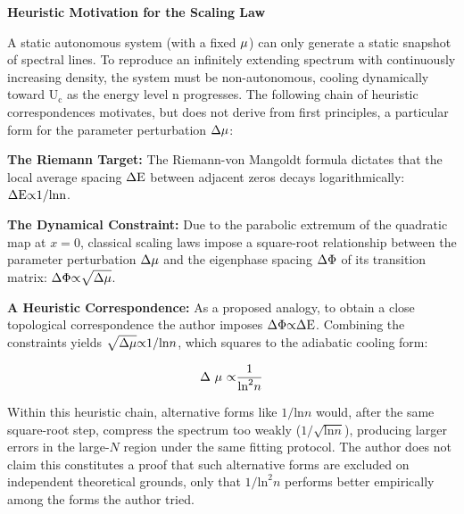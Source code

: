 \documentclass[mca,article,submit,oneauthor,pdftex]{Definitions/mdpi}
\begin{document}
\textbf{Heuristic Motivation for the Scaling Law}\label{sec:scaling-derivation}

A static autonomous system (with a fixed \(\text{\ensuremath{\mu}}\)) can only generate
a static snapshot of spectral lines. To reproduce an infinitely
extending spectrum with continuously increasing density, the system must
be non-autonomous, cooling dynamically toward \(\text{U}_{\text{c}}\) as
the energy level \(\text{n}\) progresses. The following chain of
heuristic correspondences motivates, but does not derive from first
principles, a particular form for the parameter perturbation
\(\text{\ensuremath{\Delta}}\text{\ensuremath{\mu}}\):

\textbf{The Riemann Target:} The Riemann-von Mangoldt formula dictates
that the local average spacing \(\text{\ensuremath{\Delta}}\text{E}\) between adjacent
zeros decays logarithmically: \(\text{\ensuremath{\Delta}}\text{E}\text{\ensuremath{\propto}1/ln}\text{n}\).

\textbf{The Dynamical Constraint:} Due to the parabolic extremum of the
quadratic map at \(x=0\), classical scaling laws impose a
square-root relationship between the parameter perturbation
\(\text{\ensuremath{\Delta}}\text{\ensuremath{\mu}}\) and the eigenphase spacing \(\text{\ensuremath{\Delta}\ensuremath{\Phi}}\) of its
transition matrix: \(\text{\ensuremath{\Delta}\ensuremath{\Phi}\ensuremath{\propto}}\sqrt{\text{\ensuremath{\Delta}}\text{\ensuremath{\mu}}}\).

\textbf{A Heuristic Correspondence:} As a proposed analogy, to obtain a
close topological correspondence the author imposes \(\text{\ensuremath{\Delta}\ensuremath{\Phi}\ensuremath{\propto}\ensuremath{\Delta}}\text{E}\).
Combining the constraints yields \(\sqrt{\text{\ensuremath{\Delta}}\text{\ensuremath{\mu}}}\text{\ensuremath{\propto}1/ln}{n}\),
which squares to the adiabatic cooling form:

\begin{equation}
\text{\ensuremath{\Delta}}~\text{\ensuremath{\mu}}~\text{\ensuremath{\propto}}\frac{\text{1}}{\text{ln}^{\text{2}}{n}}
\end{equation}

Within this heuristic chain, alternative forms like
\(\text{1/ln}{n}\) would, after the same square-root step, compress the
spectrum too weakly (\(\text{1/}\sqrt{\text{ln}{n}}\)), producing larger
errors in the large-$N$ region under the same fitting protocol. The author does not
claim this constitutes a proof that such alternative forms are excluded
on independent theoretical grounds, only that \(\text{1/ln}^{\text{2}}n\)
performs better empirically among the forms the author tried.
\end{document}
